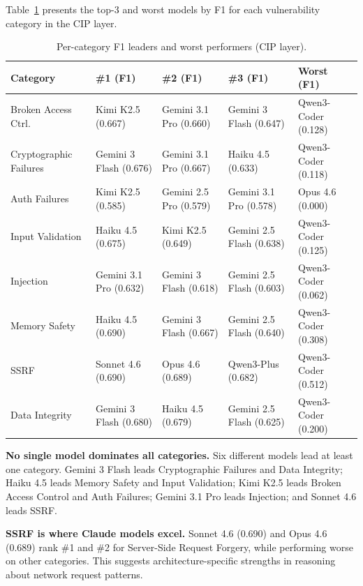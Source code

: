 \documentclass[10pt,twocolumn]{article}
\begin{document}
Table~\ref{tab:category_f1} presents the top-3 and worst models by F1 for each vulnerability category in the CIP layer.

\begin{table}[t]
\centering
\caption{Per-category F1 leaders and worst performers (CIP layer).}
\label{tab:category_f1}
\small
\begin{tabular}{@{}l l l l l@{}}
\toprule
\textbf{Category} & \textbf{\#1 (F1)} & \textbf{\#2 (F1)} & \textbf{\#3 (F1)} & \textbf{Worst (F1)} \\
\midrule
Broken Access Ctrl.     & Kimi K2.5 (0.667)    & Gemini 3.1 Pro (0.660) & Gemini 3 Flash (0.647) & Qwen3-Coder (0.128) \\
Cryptographic Failures  & Gemini 3 Flash (0.676) & Gemini 3.1 Pro (0.667) & Haiku 4.5 (0.633) & Qwen3-Coder (0.118) \\
Auth Failures           & Kimi K2.5 (0.585)    & Gemini 2.5 Pro (0.579) & Gemini 3.1 Pro (0.578) & Opus 4.6 (0.000) \\
Input Validation        & Haiku 4.5 (0.675)    & Kimi K2.5 (0.649)      & Gemini 2.5 Flash (0.638) & Qwen3-Coder (0.125) \\
Injection               & Gemini 3.1 Pro (0.632) & Gemini 3 Flash (0.618) & Gemini 2.5 Flash (0.603) & Qwen3-Coder (0.062) \\
Memory Safety           & Haiku 4.5 (0.690)    & Gemini 3 Flash (0.667) & Gemini 2.5 Flash (0.640) & Qwen3-Coder (0.308) \\
SSRF                    & Sonnet 4.6 (0.690)   & Opus 4.6 (0.689)       & Qwen3-Plus (0.682) & Qwen3-Coder (0.512) \\
Data Integrity          & Gemini 3 Flash (0.680) & Haiku 4.5 (0.679)     & Gemini 2.5 Flash (0.625) & Qwen3-Coder (0.200) \\
\bottomrule
\end{tabular}
\end{table}

\textbf{No single model dominates all categories.} Six different models lead at least one category. Gemini 3 Flash leads Cryptographic Failures and Data Integrity; Haiku 4.5 leads Memory Safety and Input Validation; Kimi K2.5 leads Broken Access Control and Auth Failures; Gemini 3.1 Pro leads Injection; and Sonnet 4.6 leads SSRF.

\textbf{SSRF is where Claude models excel.} Sonnet 4.6 (0.690) and Opus 4.6 (0.689) rank \#1 and \#2 for Server-Side Request Forgery, while performing worse on other categories. This suggests architecture-specific strengths in reasoning about network request patterns.
\end{document}
